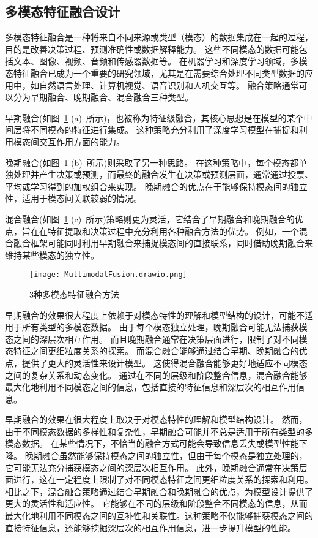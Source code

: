 \subsection{多模态特征融合设计}
多模态特征融合是一种将来自不同来源或类型（模态）的数据集成在一起的过程，目的是改善决策过程、预测准确性或数据解释能力。
这些不同模态的数据可能包括文本、图像、视频、音频和传感器数据等。
在机器学习和深度学习领域，多模态特征融合已成为一个重要的研究领域，尤其是在需要综合处理不同类型数据的应用中，如自然语言处理、计算机视觉、语音识别和人机交互等。
融合策略通常可以分为早期融合、晚期融合、混合融合三种类型。\par

早期融合(如图~\ref{fig:MultimodalFusio} (a)~所示)，也被称为特征级融合，其核心思想是在模型的某个中间层将不同模态的特征进行集成。
这种策略充分利用了深度学习模型在捕捉和利用模态间交互作用方面的能力。\par

晚期融合(如图~\ref{fig:MultimodalFusio} (b)~所示)则采取了另一种思路。
在这种策略中，每个模态都单独处理并产生决策或预测，而最终的融合发生在决策或预测层面，通常通过投票、平均或学习得到的加权组合来实现。
晚期融合的优点在于能够保持模态间的独立性，适用于模态间关联较弱的情况。\par

混合融合(如图~\ref{fig:MultimodalFusio} (c)~所示)策略则更为灵活，它结合了早期融合和晚期融合的优点，旨在在特征提取和决策过程中充分利用各种融合方法的优势。
例如，一个混合融合框架可能同时利用早期融合来捕捉模态间的直接联系，同时借助晚期融合来维持某些模态的独立性。

\begin{figure}[h]
  \centering
  \texttt{[image: MultimodalFusion.drawio.png]}
  \caption{3种多模态特征融合方法\cite{hejunandzhangcaiqing}}
  \label{fig:MultimodalFusio}
\end{figure}

早期融合的效果很大程度上依赖于对模态特性的理解和模型结构的设计，可能不适用于所有类型的多模态数据。
由于每个模态独立处理，晚期融合可能无法捕获模态之间的深层次相互作用。
而且晚期融合通常在决策层面进行，限制了对不同模态特征之间更细粒度关系的探索。
而混合融合能够通过结合早期、晚期融合的优点，提供了更大的灵活性来设计模型。
这使得混合融合能够更好地适应不同模态之间的复杂关系和动态变化。
通过在不同的层级和阶段整合信息，混合融合能够最大化地利用不同模态之间的信息，包括直接的特征信息和深层次的相互作用信息。\par

早期融合的效果在很大程度上取决于对模态特性的理解和模型结构设计。
然而，由于不同模态数据的多样性和复杂性，早期融合可能并不总是适用于所有类型的多模态数据。
在某些情况下，不恰当的融合方式可能会导致信息丢失或模型性能下降。
晚期融合虽然能够保持模态之间的独立性，但由于每个模态是独立处理的，它可能无法充分捕获模态之间的深层次相互作用。
此外，晚期融合通常在决策层面进行，这在一定程度上限制了对不同模态特征之间更细粒度关系的探索和利用。
相比之下，混合融合策略通过结合早期融合和晚期融合的优点，为模型设计提供了更大的灵活性和适应性。
它能够在不同的层级和阶段整合不同模态的信息，从而最大化地利用不同模态之间的互补性和关联性。这种策略不仅能够捕获模态之间的直接特征信息，还能够挖掘深层次的相互作用信息，进一步提升模型的性能。\par



